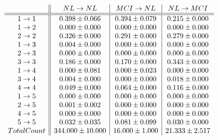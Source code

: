 \documentclass[12pt,a4paper]{article}
\begin{document}
\[ \begin{array}{ c || c | c | c }
 & NL \rightarrow NL & MCI \rightarrow NL & NL \rightarrow MCI\\ 
\hline
\hline
1 \rightarrow 1 & 0.398 \pm 0.066 & 0.394 \pm 0.079 & 0.215 \pm 0.000 \\
1 \rightarrow 2 & 0.000 \pm 0.000 & 0.000 \pm 0.000 & 0.000 \pm 0.000 \\
2 \rightarrow 2 & 0.326 \pm 0.000 & 0.291 \pm 0.000 & 0.279 \pm 0.000 \\
1 \rightarrow 3 & 0.004 \pm 0.000 & 0.000 \pm 0.000 & 0.000 \pm 0.000 \\
2 \rightarrow 3 & 0.000 \pm 0.000 & 0.000 \pm 0.000 & 0.000 \pm 0.000 \\
3 \rightarrow 3 & 0.186 \pm 0.000 & 0.170 \pm 0.000 & 0.343 \pm 0.000 \\
1 \rightarrow 4 & 0.000 \pm 0.081 & 0.000 \pm 0.023 & 0.000 \pm 0.000 \\
3 \rightarrow 4 & 0.004 \pm 0.000 & 0.000 \pm 0.000 & 0.018 \pm 0.000 \\
4 \rightarrow 4 & 0.049 \pm 0.000 & 0.064 \pm 0.000 & 0.116 \pm 0.000 \\
1 \rightarrow 5 & 0.000 \pm 0.000 & 0.000 \pm 0.000 & 0.000 \pm 0.000 \\
2 \rightarrow 5 & 0.001 \pm 0.002 & 0.000 \pm 0.000 & 0.000 \pm 0.000 \\
4 \rightarrow 5 & 0.000 \pm 0.000 & 0.000 \pm 0.000 & 0.000 \pm 0.000 \\
5 \rightarrow 5 & 0.032 \pm 0.035 & 0.081 \pm 0.099 & 0.030 \pm 0.000 \\
Total Count & 344.000 \pm 10.000 & 16.000 \pm 1.000 & 21.333 \pm 2.517\\
\end{array} \]
\end{document}
